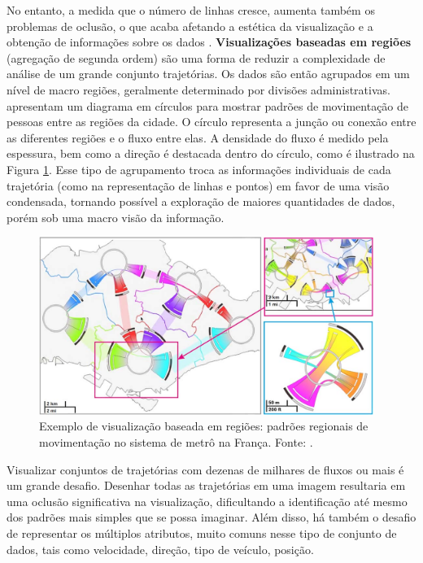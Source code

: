 No entanto, a medida que o número de linhas cresce, aumenta também os
problemas de oclusão, o que acaba afetando a estética da visualização e a
obtenção de informações sobre os dados \citep{Zhou2013}. \textbf{Visualizações baseadas
em regiões} (agregação de segunda ordem) são uma forma de reduzir
a complexidade de análise de um grande conjunto trajetórias. Os dados 
são então agrupados em um nível de macro regiões, geralmente determinado por divisões administrativas.
\citet{Zeng2013} apresentam um diagrama em círculos para mostrar padrões de movimentação de
pessoas entre as regiões da cidade. O círculo representa a junção ou conexão
entre as diferentes regiões e o fluxo entre elas. A densidade do fluxo é medido
pela espessura, bem como a direção é destacada dentro do círculo, como é
ilustrado na Figura \ref{fig:interchange-circo}. Esse tipo de agrupamento
troca as informações individuais de cada trajetória  (como na representação de linhas e pontos)
em favor de uma visão condensada, tornando possível a exploração de maiores quantidades de dados, porém
sob uma macro visão da informação.

\begin{figure}[!h]
  \centering
  \includegraphics[width=0.97\textwidth]{../figuras/region-based.png}
  \caption[Exemplo de visualização baseada em regiões do sistema de metrô na França]{Exemplo de visualização baseada em regiões: padrões regionais de movimentação no sistema de metrô na França. Fonte: \citet{Zeng2013}.}
  \label{fig:interchange-circo}
\end{figure}

Visualizar conjuntos de trajetórias com dezenas de milhares de fluxos ou mais é um grande desafio.
Desenhar todas as trajetórias em uma imagem resultaria em uma oclusão significativa na visualização,
dificultando a identificação até mesmo dos padrões mais simples que se possa imaginar. Além disso,
há também o desafio de representar os múltiplos atributos, muito comuns nesse tipo de conjunto de dados,
tais como velocidade, direção, tipo de veículo, posição. 

